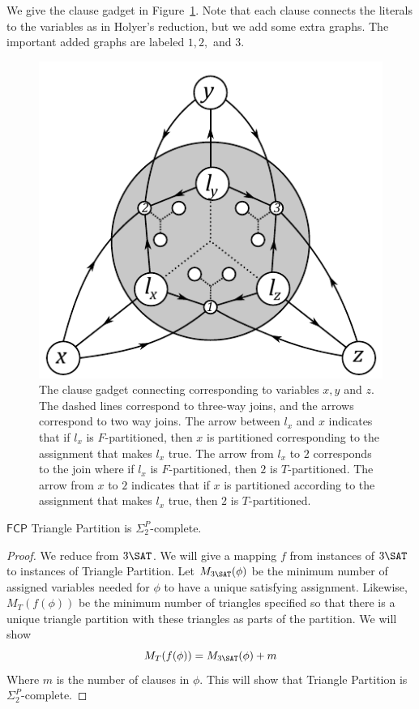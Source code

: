 \documentclass[runningheads,a4paper]{llncs}
\begin{document}
We give the clause gadget in Figure~\ref{fig:clausegadget}. Note that each clause connects the literals to the variables as in Holyer's reduction, but we add some extra graphs. The important added graphs are labeled $1, 2,$ and 3. 
\begin{figure}
\label{fig:clausegadget}
\centering
\includegraphics[width=\linewidth]{Triangle_clause_gadget.pdf}
\caption{The clause gadget connecting corresponding to variables $x, y$ and $z$. The dashed lines correspond to three-way joins, and the arrows correspond to two way joins. The arrow between $l_x$ and $x$ indicates that if $l_x$ is $F$-partitioned, then $x$ is partitioned corresponding to the assignment that makes $l_x$ true. The arrow from $l_x$ to $2$ corresponds to the join where if $l_x$ is $F$-partitioned, then $2$ is $T$-partitioned. The arrow from $x$ to $2$ indicates that if $x$ is partitioned according to the assignment that makes $l_x$ true, then $2$ is $T$-partitioned.}
\end{figure}


\begin{theorem}
$\mathsf{FCP}$ Triangle Partition is $\Sigma_2^P$-complete.
\end{theorem}

\begin{proof}
We reduce from $3\SAT$. We will give a mapping $f$ from instances of $3\SAT$ to instances of Triangle Partition. Let $M_{3\SAT}(\phi)$ be the minimum number of assigned variables needed for $\phi$ to have a unique satisfying assignment. Likewise, $M_{T}(f(\phi))$ be the minimum number of triangles specified so that there is a unique triangle partition with these triangles as parts of the partition. We will show
\[ M_{T}(f(\phi)) = M_{3\SAT}(\phi) + m \]
Where $m$ is the number of clauses in $\phi$. This will show that Triangle Partition is $\Sigma_2^P$-complete.
\end{proof}
\end{document}
